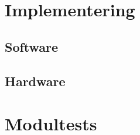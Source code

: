


\section{Implementering}
\label{vs_implementering}



\subsection*{Software}
\label{vs_implementering_sw}


\subsection*{Hardware}
\label{vs_implementering_hw}

\section{Modultests}
\label{vs_modultests}